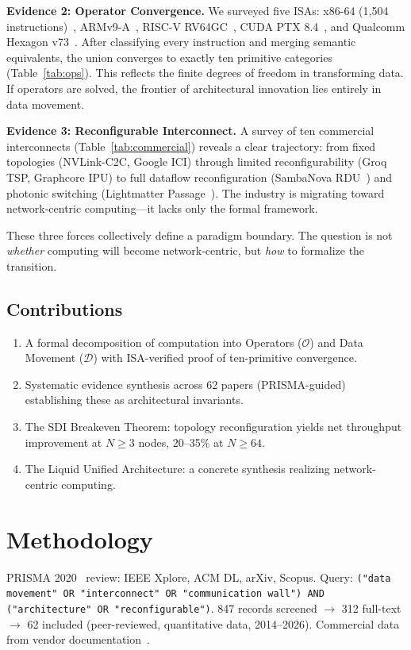 ﻿\documentclass[review,3p,twocolumn]{elsarticle}
\begin{document}
\textbf{Evidence 2: Operator Convergence.} We surveyed five ISAs: x86-64 (1,504 instructions)~\cite{intel2023}, ARMv9-A~\cite{arm2023}, RISC-V RV64GC~\cite{riscv2023}, CUDA PTX 8.4~\cite{nvidiaptx2024}, and Qualcomm Hexagon v73~\cite{qualcomm2023}. After classifying every instruction and merging semantic equivalents, the union converges to exactly ten primitive categories (Table~\ref{tab:ops}). This reflects the finite degrees of freedom in transforming data. If operators are solved, the frontier of architectural innovation lies entirely in data movement.

\textbf{Evidence 3: Reconfigurable Interconnect.} A survey of ten commercial interconnects (Table~\ref{tab:commercial}) reveals a clear trajectory: from fixed topologies (NVLink-C2C, Google ICI) through limited reconfigurability (Groq TSP, Graphcore IPU) to full dataflow reconfiguration (SambaNova RDU~\cite{sambanova2026}) and photonic switching (Lightmatter Passage~\cite{lightmatter2025}). The industry is migrating toward network-centric computing---it lacks only the formal framework.

These three forces collectively define a paradigm boundary. The question is not \emph{whether} computing will become network-centric, but \emph{how} to formalize the transition.

\subsection{Contributions}
\begin{enumerate}
    \item A formal decomposition of computation into Operators ($\mathcal{O}$) and Data Movement ($\mathcal{D}$) with ISA-verified proof of ten-primitive convergence.
    \item Systematic evidence synthesis across 62 papers (PRISMA-guided) establishing these as architectural invariants.
    \item The SDI Breakeven Theorem: topology reconfiguration yields net throughput improvement at $N\geq3$ nodes, 20--35\% at $N\geq64$.
    \item The Liquid Unified Architecture: a concrete synthesis realizing network-centric computing.
\end{enumerate}

\section{Methodology}
\label{sec:methods}
PRISMA 2020~\cite{page2021} review: IEEE Xplore, ACM DL, arXiv, Scopus. Query: \texttt{("data movement" OR "interconnect" OR "communication wall") AND ("architecture" OR "reconfigurable")}. 847 records screened $\rightarrow$ 312 full-text $\rightarrow$ 62 included (peer-reviewed, quantitative data, 2014--2026). Commercial data from vendor documentation~\cite{nvidia2025,google2023,tesla2022,groq2024,graphcore2023,intel2024,amd2024,sambanova2026,lightmatter2025,nvswitch2024}.
\end{document}
